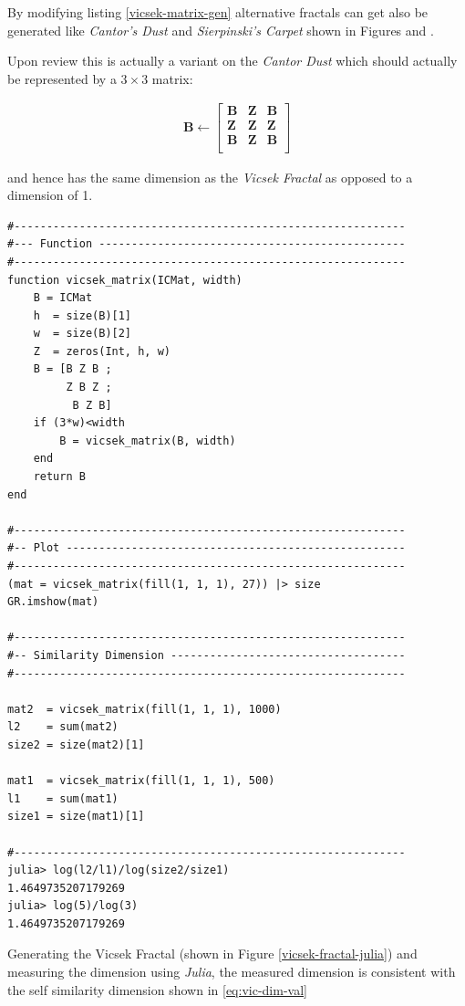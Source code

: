 \documentclass[a4paper,11pt,twoside]{article}
\begin{document}
By modifying listing \ref{vicsek-matrix-gen} alternative fractals can get also be generated like \emph{Cantor's Dust} and \emph{Sierpinski's Carpet} shown in Figures and .

Upon review this is actually a variant on the \emph{Cantor Dust} which should
actually be represented by a \(3 \times 3\) matrix:

\begin{align}
 \mathbf{B} \leftarrow
 \begin{bmatrix}
    \mathbf{B} & \mathbf{Z} & \mathbf{B} \\
    \mathbf{Z} & \mathbf{Z} & \mathbf{Z} \\
    \mathbf{B} & \mathbf{Z} & \mathbf{B} \\
\end{bmatrix}
\end{align}


and hence has the same dimension as the \emph{Vicsek Fractal} as opposed to a
dimension of 1.


\begin{listing}[htbp]
\begin{verbatim}
#------------------------------------------------------------
#--- Function -----------------------------------------------
#------------------------------------------------------------
function vicsek_matrix(ICMat, width)
    B = ICMat
    h  = size(B)[1]
    w  = size(B)[2]
    Z  = zeros(Int, h, w)
    B = [B Z B ;
         Z B Z ;
          B Z B]
    if (3*w)<width
        B = vicsek_matrix(B, width)
    end
    return B
end

#------------------------------------------------------------
#-- Plot ----------------------------------------------------
#------------------------------------------------------------
(mat = vicsek_matrix(fill(1, 1, 1), 27)) |> size
GR.imshow(mat)

#------------------------------------------------------------
#-- Similarity Dimension ------------------------------------
#------------------------------------------------------------

mat2  = vicsek_matrix(fill(1, 1, 1), 1000)
l2    = sum(mat2)
size2 = size(mat2)[1]

mat1  = vicsek_matrix(fill(1, 1, 1), 500)
l1    = sum(mat1)
size1 = size(mat1)[1]

#------------------------------------------------------------
julia> log(l2/l1)/log(size2/size1)
1.4649735207179269
julia> log(5)/log(3)
1.4649735207179269
\end{verbatim}
\caption{\label{vicsek-matrix-gen}Generating the Vicsek Fractal (shown in Figure \ref{vicsek-fractal-julia}) and measuring the dimension using \emph{Julia}, the measured dimension is consistent with the self similarity dimension shown in \eqref{eq:vic-dim-val}}
\end{listing}
\end{document}
